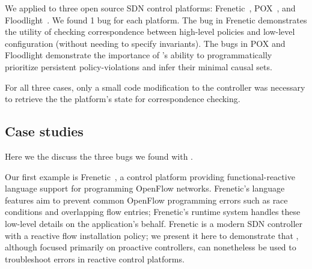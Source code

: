 We applied \projectname{} to three open source SDN control platforms: 
Frenetic~\cite{frenetic}, POX~\cite{pox}, and Floodlight~\cite{bigswitch}.
We found 1 bug for each platform. The bug in Frenetic demonstrates 
the utility of checking correspondence between high-level policies and
low-level configuration (without needing to specify invariants). The bugs in
POX and Floodlight demonstrate the importance of \simulator{}'s ability to 
programmatically prioritize persistent policy-violations and infer their minimal
causal sets.

For all three cases, only a small code modification to the controller was necessary 
to retrieve the the platform's state for correspondence
checking. 

\subsection{Case studies}

Here we the discuss the three bugs we found with \projectname{}.

 Our first example is Frenetic~\cite{frenetic}, a control platform 
providing functional-reactive language
support for programming OpenFlow networks.
Frenetic's language features aim to prevent common OpenFlow programming
errors such as race conditions and overlapping flow entries; Frenetic's
runtime system handles these low-level details on
the application's behalf. Frenetic is a modern SDN controller with a reactive
flow installation policy;
we present it here to demonstrate that \projectname{}, although focused
primarily on proactive controllers, can nonetheless be used to
troubleshoot errors in reactive control platforms.


